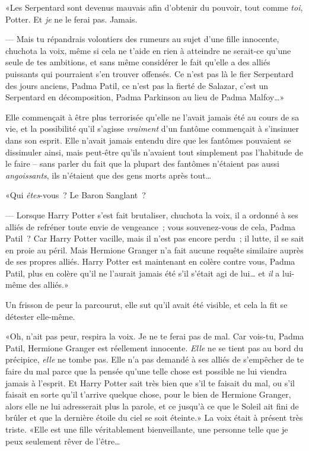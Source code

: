 «Les Serpentard sont devenus mauvais afin d'obtenir du pouvoir, tout comme \emph{toi}, Potter. Et \emph{je} ne le ferai pas. Jamais.

--- Mais tu répandrais volontiers des rumeurs au sujet d'une fille innocente, chuchota la voix, même si cela ne t'aide en rien à atteindre ne serait-ce qu'une seule de tes ambitions, et sans même considérer le fait qu'elle a des alliés puissants qui pourraient s'en trouver offensés. Ce n'est pas là le fier Serpentard des jours anciens, Padma Patil, ce n'est pas la fierté de Salazar, c'est un Serpentard en décomposition, Padma Parkinson au lieu de Padma Malfoy…»

Elle commençait à être plus terrorisée qu'elle ne l'avait jamais été au cours de sa vie, et la possibilité qu'il s'agisse \emph{vraiment} d'un fantôme commençait à s'insinuer dans son esprit. Elle n'avait jamais entendu dire que les fantômes pouvaient se dissimuler ainsi, mais peut-être qu'ils n'avaient tout simplement pas l'habitude de le faire -- sans parler du fait que la plupart des fantômes n'étaient pas aussi \emph{angoissants}, ils n'étaient que des gens morts après tout…

«Qui \emph{êtes}-vous~? Le Baron Sanglant~?

--- Lorsque Harry Potter s'est fait brutaliser, chuchota la voix, il a ordonné à ses alliés de refréner toute envie de vengeance~; vous souvenez-vous de cela, Padma Patil~? Car Harry Potter vacille, mais il n'est pas encore perdu~; il lutte, il se sait en proie au péril. Mais Hermione Granger n'a fait aucune requête similaire auprès de ses propres alliés. Harry Potter est maintenant en colère contre vous, Padma Patil, plus en colère qu'il ne l'aurait jamais été s'il s'était agi de lui… et \emph{il} a lui-même des alliés.»

Un frisson de peur la parcourut, elle sut qu'il avait été visible, et cela la fit se détester elle-même.

«Oh, n'ait pas peur, respira la voix. Je ne te ferai pas de mal. Car vois-tu, Padma Patil, Hermione Granger est réellement innocente. \emph{Elle} ne se tient pas au bord du précipice, \emph{elle} ne tombe pas. Elle n'a pas demandé à ses alliés de s'empêcher de te faire du mal parce que la pensée qu'une telle chose est possible ne lui viendra jamais à l'esprit. Et Harry Potter sait très bien que s'il te faisait du mal, ou s'il faisait en sorte qu'il t'arrive quelque chose, pour le bien de Hermione Granger, alors elle ne lui adresserait plus la parole, et ce jusqu'à ce que le Soleil ait fini de brûler et que la dernière étoile du ciel se soit éteinte.» La voix était à présent très triste. «Elle est une fille véritablement bienveillante, une personne telle que je peux seulement rêver de l'être…

